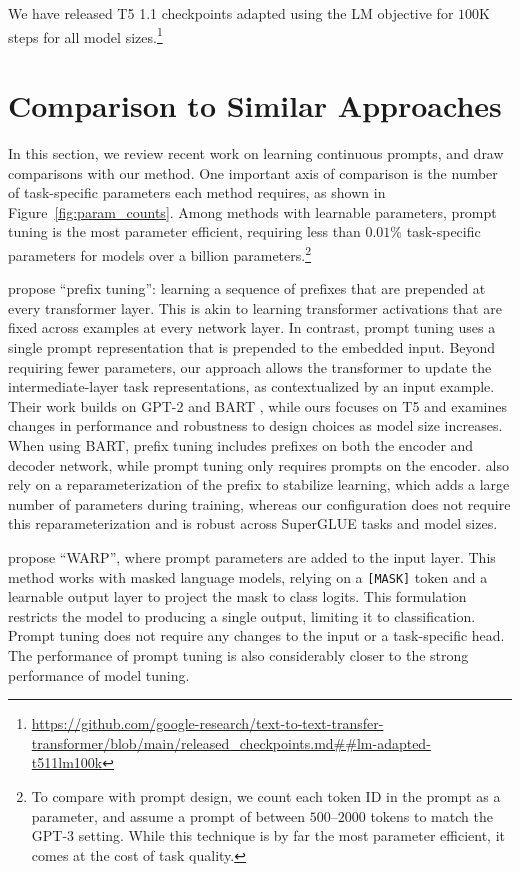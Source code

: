 We have released T5 1.1 checkpoints adapted using the LM objective for $100$K steps for all model sizes.\footnote{\url{https://github.com/google-research/text-to-text-transfer-transformer/blob/main/released_checkpoints.md##lm-adapted-t511lm100k}}

\section{Comparison to Similar Approaches}
\label{sec:previous_work}

In this section, we review recent work on learning continuous prompts, and draw comparisons with our method. One important axis of comparison is the number of task-specific parameters each method requires, as shown in Figure~\ref{fig:param_counts}. Among methods with learnable parameters, prompt tuning is the most parameter efficient, requiring less than $0.01$\% task-specific parameters for models over a billion parameters.\footnote{To compare with prompt design, we count each token ID in the prompt as a parameter, and assume a prompt of between $500$--$2000$ tokens to match the GPT-3 setting. While this technique is by far the most parameter efficient, it comes at the cost of task quality.}

\citet{li_2021_prefix_tuning} propose ``prefix tuning'': learning a sequence of prefixes that are prepended at every transformer layer. This is akin to learning transformer activations that are fixed across examples at every network layer. In contrast, prompt tuning uses a single prompt representation that is prepended to the embedded input. Beyond requiring fewer parameters, our approach allows the transformer to update the intermediate-layer task representations, as contextualized by an input example. Their work builds on GPT-2 \cite{radford2019language} and BART \cite{lewis-etal-2020-bart}, while ours focuses on T5 and examines changes in performance and robustness to design choices as model size increases. When using BART, prefix tuning includes prefixes on both the encoder and decoder network, while prompt tuning only requires prompts on the encoder. \citet{li_2021_prefix_tuning} also rely on a reparameterization of the prefix to stabilize learning, which adds a large number of parameters during training, whereas our configuration does not require this reparameterization and is robust across SuperGLUE tasks and model sizes.

\citet{hambardzumyan_2021_warp} propose ``WARP'', where prompt parameters are added to the input layer. This method works with masked language models, relying on a {\tt [MASK]} token and a learnable output layer to project the mask to class logits. This formulation restricts the model to producing a single output, limiting it to classification. Prompt tuning does not require any changes to the input or a task-specific head. The performance of prompt tuning is also considerably closer to the strong performance of model tuning.

